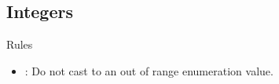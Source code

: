 \subsection{Integers}

\begin{frame}[t]{Rules}
\begin{itemize}
  \item {}: 
        Do not cast to an out of range enumeration value.
\end{itemize}
\end{frame}


